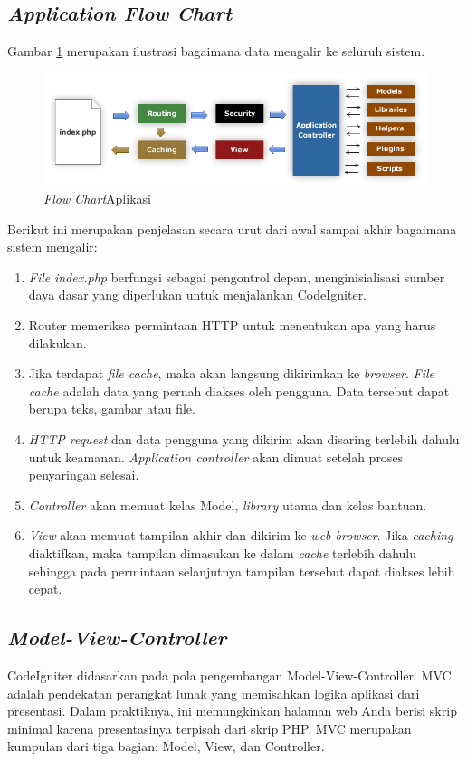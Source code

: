 \subsection{\textit{Application Flow Chart}}
\label{sec: Application Flow Chart}

Gambar \ref{fig:flowchart} merupakan ilustrasi bagaimana data mengalir ke seluruh sistem\cite{codeigniter}.
 \begin{figure}[h!]
     \centering
     \includegraphics[width=0.9\linewidth]{Gambar/appflowchart.png}
     \caption{\textit{Flow Chart}Aplikasi}
     \label{fig:flowchart}
 \end{figure}
 
Berikut ini merupakan penjelasan secara urut dari awal sampai akhir bagaimana sistem mengalir:
\begin{enumerate}
    \item \textit{File} \textit{index.php} berfungsi sebagai pengontrol depan, menginisialisasi sumber daya dasar yang diperlukan untuk menjalankan CodeIgniter.
    \item Router memeriksa permintaan HTTP untuk menentukan apa yang harus dilakukan.
    \item Jika terdapat \textit{file cache}, maka akan langsung dikirimkan ke \textit{browser}. \textit{File cache} adalah data yang pernah diakses oleh pengguna. Data tersebut dapat berupa teks, gambar atau file.
    \item \textit{HTTP request} dan data pengguna yang dikirim akan disaring terlebih dahulu untuk keamanan. \textit{Application controller} akan dimuat setelah proses penyaringan selesai.
    \item \textit{Controller} akan memuat kelas Model, \textit{library} utama dan kelas bantuan.
    \item \textit{View} akan memuat tampilan akhir dan dikirim ke \textit{web browser}. Jika \textit{caching} diaktifkan, maka tampilan dimasukan ke dalam \textit{cache} terlebih dahulu sehingga pada permintaan selanjutnya tampilan tersebut dapat diakses lebih cepat.
\end{enumerate}

\subsection{\textit{Model-View-Controller}}
\label{sec:Model-View-Controller}
CodeIgniter didasarkan pada pola pengembangan Model-View-Controller\cite{codeigniter}. MVC adalah pendekatan perangkat lunak yang memisahkan logika aplikasi dari presentasi. Dalam praktiknya, ini memungkinkan halaman web Anda berisi skrip minimal karena presentasinya terpisah dari skrip PHP.  MVC merupakan kumpulan dari tiga bagian: Model, View, dan Controller. 

